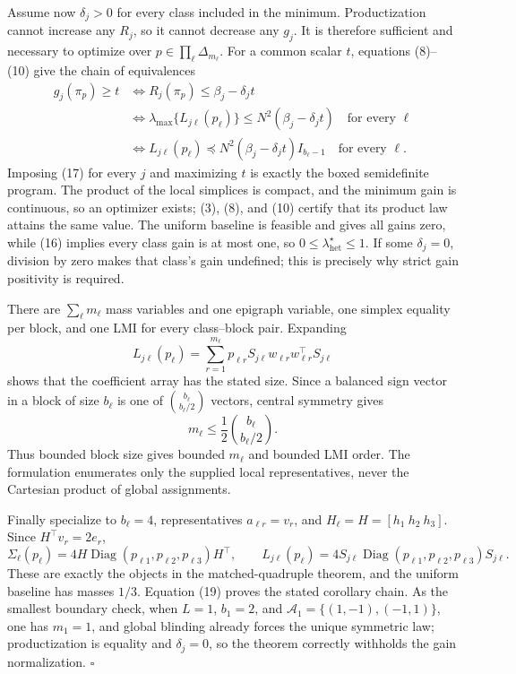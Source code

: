 Assume now \(\delta_j>0\) for every class included in the minimum.  Productization cannot increase any \(R_j\), so it cannot decrease any \(g_j\).  It is therefore sufficient and necessary to optimize over \(p\in\prod_\ell\Delta_{m_\ell}\).  For a common scalar \(t\), equations (8)--(10) give the chain of equivalences
\[
\begin{aligned}
g_j(\pi_p)\ge t
&\iff R_j(\pi_p)\le\beta_j-\delta_jt\\
&\iff \lambda_{\max}\{L_{j\ell}(p_\ell)\}
\le N^2(\beta_j-\delta_jt)\quad\text{for every }\ell\\
&\iff L_{j\ell}(p_\ell)
\preceq N^2(\beta_j-\delta_jt)I_{b_\ell-1}
\quad\text{for every }\ell.
\end{aligned}
\tag{17}
\]
Imposing (17) for every \(j\) and maximizing \(t\) is exactly the boxed semidefinite program.  The product of the local simplices is compact, and the minimum gain is continuous, so an optimizer exists; (3), (8), and (10) certify that its product law attains the same value.  The uniform baseline is feasible and gives all gains zero, while (16) implies every class gain is at most one, so \(0\le\lambda_{\mathrm{het}}^\star\le1\).  If some \(\delta_j=0\), division by zero makes that class's gain undefined; this is precisely why strict gain positivity is required.

There are \(\sum_\ell m_\ell\) mass variables and one epigraph variable, one simplex equality per block, and one LMI for every class--block pair.  Expanding
\[
L_{j\ell}(p_\ell)
=\sum_{r=1}^{m_\ell}p_{\ell r}
S_{j\ell}w_{\ell r}w_{\ell r}^\top S_{j\ell}
\]
shows that the coefficient array has the stated size.  Since a balanced sign vector in a block of size \(b_\ell\) is one of \(\binom{b_\ell}{b_\ell/2}\) vectors, central symmetry gives
\[
m_\ell\le\frac12\binom{b_\ell}{b_\ell/2}.
\tag{18}
\]
Thus bounded block size gives bounded \(m_\ell\) and bounded LMI order.  The formulation enumerates only the supplied local representatives, never the Cartesian product of global assignments.

Finally specialize to \(b_\ell=4\), representatives \(a_{\ell r}=v_r\), and \(H_\ell=H=[h_1\ h_2\ h_3]\).  Since \(H^\top v_r=2e_r\),
\[
\Sigma_\ell(p_\ell)=4H\operatorname{Diag}(p_{\ell1},p_{\ell2},p_{\ell3})H^\top,
\qquad
L_{j\ell}(p_\ell)=4S_{j\ell}\operatorname{Diag}(p_{\ell1},p_{\ell2},p_{\ell3})S_{j\ell}.
\tag{19}
\]
These are exactly the objects in the matched-quadruple theorem, and the uniform baseline has masses \(1/3\).  Equation (19) proves the stated corollary chain.  As the smallest boundary check, when \(L=1\), \(b_1=2\), and \(\mathcal A_1=\{(1,-1),(-1,1)\}\), one has \(m_1=1\), and global blinding already forces the unique symmetric law; productization is equality and \(\delta_j=0\), so the theorem correctly withholds the gain normalization. \(\square\)